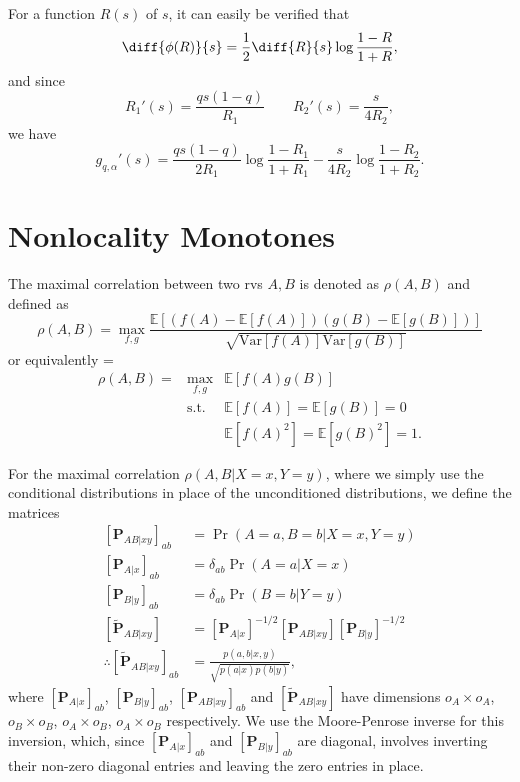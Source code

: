 \documentclass[10pt, a4paper]{article}
\newcommand{\?}{\mathrel{?}} %
\newcommand{\matrp}[2]{\left[\mathbf{#1}#2\right]} %
\newcommand{\E}{\mathbb{E}} %
\newcommand{\Var}{\mathrm{Var}} %
\newenvironment{Array}[1] %
{\def\arraystretch{1.75}\everymath={\displaystyle}\begin{equation}\begin{array}{#1}}
{\end{array}\end{equation}}
\numberwithin{equation}{section} %
\theoremstyle{definition}
\theoremstyle{plain}
\theoremstyle{plain}
\begin{document}
    For a function \(R(s)\) of \(s\), it can easily be verified that
    \begin{equation}
      \diff{\phi(R)}{s} = \frac{1}{2} \diff{R}{s} \log\frac{1-R}{1+R},
    \end{equation}
    and since
    \begin{equation} 
      R_1'(s) = \frac{qs(1-q)}{R_1} \qquad R_2'(s) = \frac{s}{4R_2},
    \end{equation}
    we have
    \begin{equation}
      g_{q,\alpha}'(s) = \frac{qs(1-q)}{2R_1} \log\frac{1-R_1}{1+R_1} - \frac{s}{4R_2} \log\frac{1-R_2}{1+R_2}.
    \end{equation}

    \section{Nonlocality Monotones}

    The maximal correlation between two rvs \(A,B\) is denoted as \(\rho(A,B)\) and defined as
    \begin{equation}
      \rho(A,B) = \max_{f,g} \frac{\E[(f(A)-\E[f(A)])(g(B)-\E[g(B)])]}{\sqrt{\Var[f(A)]\Var[g(B)]}}
    \end{equation}
    or equivalently
    \begin{Array}{rcl}
      \rho(A,B) = & \max_{f,g}  & \E[f(A)g(B)] \\
                  & \text{s.t.} & \E[f(A)] = \E[g(B)] = 0 \\
                  &             & \E[f(A)^2] = \E[g(B)^2] = 1.
    \end{Array}

    For the maximal correlation \(\rho(A,B|X=x,Y=y)\), where we simply use the conditional distributions in place of the unconditioned distributions, we define the matrices
    \begin{align}
      \matrp{P}{_{AB|xy}}_{ab} &= \Pr(A = a, B = b|X = x, Y = y) \\
      \matrp{P}{_{A|x}}_{ab} &= \delta_{ab} \Pr(A = a|X = x) \\
      \matrp{P}{_{B|y}}_{ab} &= \delta_{ab} \Pr(B = b|Y = y) \\
      \matrp{\tilde{P}}{_{AB|xy}} &= \matrp{P}{_{A|x}}^{-1/2} \matrp{P}{_{AB|xy}} \matrp{P}{_{B|y}}^{-1/2} \\
      \therefore \matrp{\tilde{P}}{_{AB|xy}}_{ab} &= \frac{p(a,b|x,y)}{\sqrt{p(a|x)p(b|y)}},
    \end{align}
    where \(\matrp{P}{_{A|x}}_{ab}\), \(\matrp{P}{_{B|y}}_{ab}\), \(\matrp{P}{_{AB|xy}}_{ab}\) and \(\matrp{\tilde{P}}{_{AB|xy}}\) have dimensions \(o_A \times o_A\), \(o_B \times o_B\), \(o_A \times o_B\), \(o_A \times o_B\) respectively. We use the Moore-Penrose inverse for this inversion, which, since \(\matrp{P}{_{A|x}}_{ab}\) and \(\matrp{P}{_{B|y}}_{ab}\) are diagonal, involves inverting their non-zero diagonal entries and leaving the zero entries in place.
\end{document}
